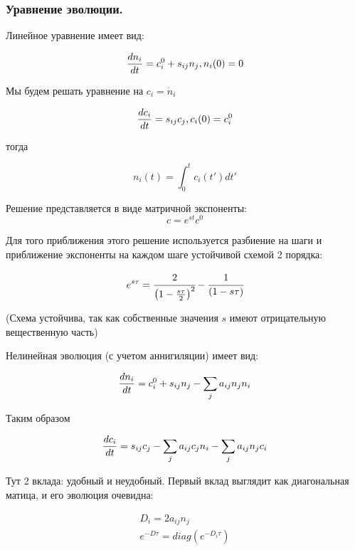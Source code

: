 \documentclass[a4paper, 14pt]{article}
\begin{document}
	
	\subsubsection{Уравнение эволюции.}
	
	Линейное уравнение имеет вид:
	
\begin{equation*}
	\frac{d n_i}{d t} = c^0_i + s_{ij} n_j, n_i(0) = 0
\end{equation*}

Мы будем решать уравнение на $c_i = \dot{n}_i$


\begin{equation*}
	\frac{d c_i}{d t} = s_{ij} c_j, c_i(0) = c^0_i
\end{equation*}

тогда 

\begin{equation*}
	n_i(t) = \int_0^t{c_i(t')dt'}
\end{equation*}

Решение представляется в виде матричной экспоненты:
\begin{equation*}
	c = e^{s t} c^0
\end{equation*}

Для того приближения этого решение используется разбиение на шаги и приближение экспоненты на каждом шаге устойчивой схемой 2 порядка:

\begin{equation*}
	e^{s \tau} = \cfrac{2}{\left(1-\frac{s \tau}{2}\right)^2}-\cfrac{1}{(1-s \tau)}
\end{equation*}

(Схема устойчива, так как собственные значения $s$ имеют отрицательную вещественную часть)



Нелинейная эволюция (с учетом аннигиляции) имеет вид:

\begin{equation*}
	\frac{d n_i}{d t} = c^0_i + s_{ij} n_j - \sum_j{a_{ij} n_j n_i}
\end{equation*}

Таким образом 

\begin{equation*}
	\frac{d c_i}{d t} = s_{ij} c_j  - \sum_j {a_{ij} c_j n_i} - \sum_j{a_{ij} n_j c_i}
\end{equation*}

Тут 2 вклада: удобный и неудобный. Первый вклад выглядит как диагональная матица, и его эволюция очевидна:

\begin{eqnarray*}
	D_i = 2 a_{ij} n_j \\
	e^{-D \tau} = diag ( e^{-D_i \tau} )
\end{eqnarray*}
\end{document}
